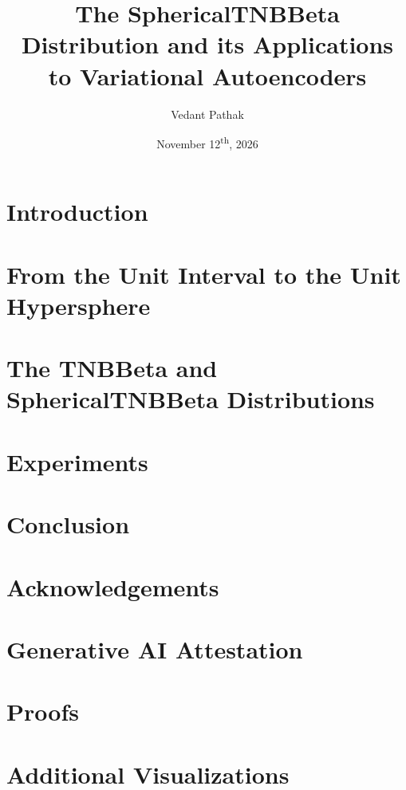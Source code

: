 \documentclass[12pt]{article}
\title{The SphericalTNBBeta Distribution and its Applications to Variational Autoencoders}
\author[1]{Vedant Pathak}
\affil[1]{Department of Statistics, University of Chicago}
\date{November 12\textsuperscript{th}, 2026}
\begin{document}
\maketitle

\begin{abstract}
    
\end{abstract}

\section{Introduction}


\section{From the Unit Interval to the Unit Hypersphere}


\section{The TNBBeta and SphericalTNBBeta Distributions}


\section{Experiments}


\section{Conclusion}


\section*{Acknowledgements}


\section*{Generative AI Attestation}


\appendix
\section{Proofs}

\section{Additional Visualizations}




\end{document}
